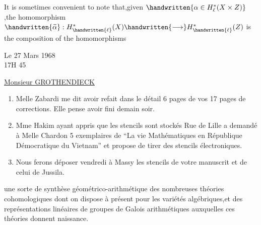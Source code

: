 It is sometimes convenient to note that,given $\handwritten{\alpha\in H_\ell^*(X\times Z)}$,the homomorphism $\handwritten{\widetilde{\alpha}}:H_{\handwritten{\ell}}^*(X)\handwritten{\longrightarrow}H_{\handwritten{\ell}}^*(Z)$ is the composition of the homomorphisms
\begin{flushright}
Le 27 Mars 1968\\
17H 45\\
\end{flushright}

\begin{center}
\uline{Monsieur GROTHENDIECK}\\
\end{center}

\begin{enumerate}[label=\arabic*.]
\item Melle Zabardi me dit avoir refait dans le détail 6 pages de vos 17 pages de corrections. Elle pense avoir fini demain soir.

\item Mme Hakim ayant appris que les stencils sont stockés Rue de Lille a demandé à Melle Chardon 5 exemplaires de ``La vie Mathématiques en République Démocratique du Vietnam'' et propose de tirer des stencils électroniques.

\item Nous ferons déposer vendredi à Massy les stencils de votre manuscrit et de celui de Jussila.
\end{enumerate}

une sorte de synthèse géométrico-arithmétique des nombreuses théories cohomologiques dont on dispose à présent pour les variétés algébriques,et des représentations linéaires de groupes de Galois arithmétiques auxquelles ces théories donnent naissance.

